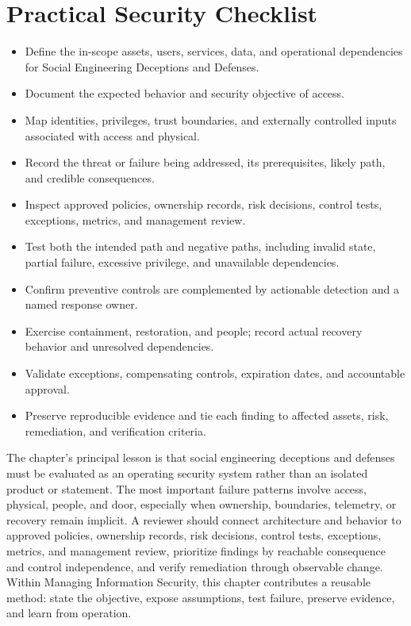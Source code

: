 \documentclass[11pt]{article}
\begin{document}
\section*{Practical Security Checklist}
\begin{itemize}[label=$\square$]
\item Define the in-scope assets, users, services, data, and operational dependencies for Social Engineering Deceptions and Defenses.
\item Document the expected behavior and security objective of access.
\item Map identities, privileges, trust boundaries, and externally controlled inputs associated with access and physical.
\item Record the threat or failure being addressed, its prerequisites, likely path, and credible consequences.
\item Inspect approved policies, ownership records, risk decisions, control tests, exceptions, metrics, and management review.
\item Test both the intended path and negative paths, including invalid state, partial failure, excessive privilege, and unavailable dependencies.
\item Confirm preventive controls are complemented by actionable detection and a named response owner.
\item Exercise containment, restoration, and people; record actual recovery behavior and unresolved dependencies.
\item Validate exceptions, compensating controls, expiration dates, and accountable approval.
\item Preserve reproducible evidence and tie each finding to affected assets, risk, remediation, and verification criteria.
\end{itemize}
\begin{synthesisbox}
The chapter's principal lesson is that social engineering deceptions and defenses must be evaluated as an operating security system rather than an isolated product or statement. The most important failure patterns involve access, physical, people, and door, especially when ownership, boundaries, telemetry, or recovery remain implicit. A reviewer should connect architecture and behavior to approved policies, ownership records, risk decisions, control tests, exceptions, metrics, and management review, prioritize findings by reachable consequence and control independence, and verify remediation through observable change. Within Managing Information Security, this chapter contributes a reusable method: state the objective, expose assumptions, test failure, preserve evidence, and learn from operation.
\end{synthesisbox}
\end{document}
